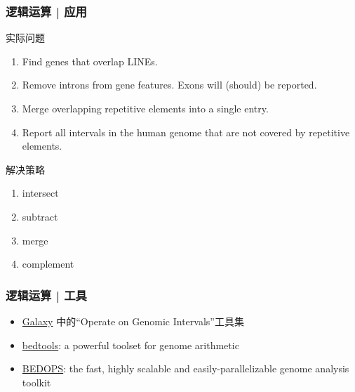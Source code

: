 \begin{frame}
  \frametitle{逻辑运算 | \alert{应用}}
  \begin{block}{实际问题}
  \begin{enumerate}
    \item Find genes that overlap LINEs.
    \item Remove introns from gene features. Exons will (should) be reported.
    \item Merge overlapping repetitive elements into a single entry.
    \item Report all intervals in the human genome that are not covered by repetitive elements.
  \end{enumerate}
\end{block}
  \pause
  \begin{block}{解决策略}
  \begin{enumerate}
    \item intersect
    \item subtract
    \item merge
    \item complement
  \end{enumerate}
\end{block}
\end{frame}

\begin{frame}
  \frametitle{逻辑运算 | 工具}
  \begin{itemize}
    \item \href{https://usegalaxy.org/}{Galaxy} 中的“Operate on Genomic Intervals”工具集
    \item \href{http://bedtools.readthedocs.org/en/latest/}{bedtools}: a powerful toolset for genome arithmetic
    \item \href{https://bedops.readthedocs.org/en/latest/}{BEDOPS}: the fast, highly scalable and easily-parallelizable genome analysis toolkit
  \end{itemize}
\end{frame}

